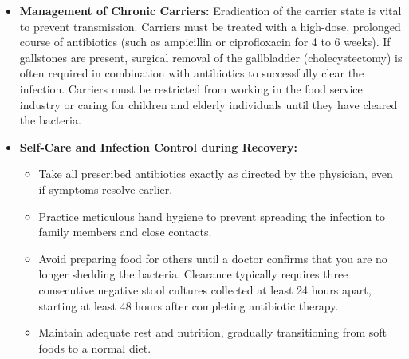 \begin{itemize}
\begin{itemize}
  \item \textit{Oral Ty21a Vaccine:} A live attenuated strain of \textit{S.} Typhi administered orally as 3 or 4 capsules on alternate days. It is approved for individuals aged 5 to 6 years and older and requires a booster every 5 years. It is contraindicated in pregnant women, immunocompromised individuals, and patients taking antibiotics.
  \item Note: Currently available vaccines target \textit{S.} Typhi only and do not provide reliable protection against \textit{S.} Paratyphi infection.
  \end{itemize}
\item \textbf{Management of Chronic Carriers:} Eradication of the carrier state is vital to prevent transmission. Carriers must be treated with a high-dose, prolonged course of antibiotics (such as ampicillin or ciprofloxacin for 4 to 6 weeks). If gallstones are present, surgical removal of the gallbladder (cholecystectomy) is often required in combination with antibiotics to successfully clear the infection. Carriers must be restricted from working in the food service industry or caring for children and elderly individuals until they have cleared the bacteria.
\item \textbf{Self-Care and Infection Control during Recovery:}
  \begin{itemize}
  \item Take all prescribed antibiotics exactly as directed by the physician, even if symptoms resolve earlier.
  \item Practice meticulous hand hygiene to prevent spreading the infection to family members and close contacts.
  \item Avoid preparing food for others until a doctor confirms that you are no longer shedding the bacteria. Clearance typically requires three consecutive negative stool cultures collected at least 24 hours apart, starting at least 48 hours after completing antibiotic therapy.
  \item Maintain adequate rest and nutrition, gradually transitioning from soft foods to a normal diet.
  \end{itemize}
\end{itemize}

